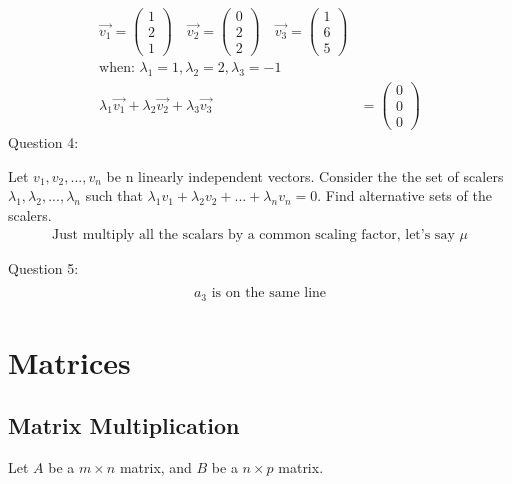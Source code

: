 \documentclass{article}
\begin{document}
\begin{align}
    \vec{v_1} = \begin{pmatrix} 1 \\ 2 \\ 1 \end{pmatrix} \quad \vec{v_2} = \begin{pmatrix} 0 \\ 2 \\ 2 \end{pmatrix} \quad \vec{v_3} = \begin{pmatrix} 1 \\ 6 \\ 5 \end{pmatrix} \\
    \textrm{when: } \lambda_1 = 1, \lambda_2 = 2, \lambda_3 = -1                                                                                                                  \\
    \lambda_1 \vec{v_1} + \lambda_2 \vec{v_2} + \lambda_3 \vec{v_3} & = \begin{pmatrix} 0 \\ 0 \\ 0 \end{pmatrix}
\end{align}
Question 4:

Let $v_1, v_2, ..., v_n$ be n linearly independent vectors.
Consider the the set of scalers $\lambda_1, \lambda_2, ..., \lambda_n$ such that $\lambda_1 v_1 + \lambda_2 v_2 + ... + \lambda_n v_n = 0$.
Find alternative sets of the scalers.
\begin{align*}
    \textrm{Just multiply all the scalars by a common scaling factor, let's say } \mu
\end{align*}

Question 5:
\begin{align*}
    \textrm{} \\
    a_3 \textrm{ is on the same line}
\end{align*}

\section{Matrices}


\subsection{Matrix Multiplication}

Let $A$ be a $m \times n$ matrix, and $B$ be a $n \times p$ matrix.
\end{document}
